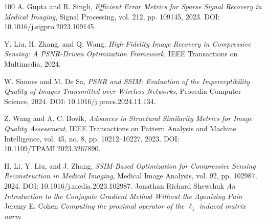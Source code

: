 \documentclass[12pt, a4paper, oneside]{extbook}
\numberwithin{equation}{chapter}
\theoremstyle{definition}
\begin{document}
\begin{thebibliography}{100}
       A. Gupta and R. Singh, \emph{Efficient Error Metrics for Sparse Signal Recovery in Medical Imaging}, Signal Processing, vol. 212, pp. 109145, 2023. DOI: 10.1016/j.sigpro.2023.109145.

       Y. Liu, H. Zhang, and Q. Wang, \emph{High-Fidelity Image Recovery in Compressive Sensing: A PSNR-Driven Optimization Framework}, IEEE Transactions on Multimedia, 2024.

       W. Simoes and M. De Sa, \emph{PSNR and SSIM: Evaluation of the Imperceptibility Quality of Images Transmitted over Wireless Networks}, Procedia Computer Science, 2024. DOI: 10.1016/j.procs.2024.11.134.


       Z. Wang and A. C. Bovik, \emph{Advances in Structural Similarity Metrics for Image Quality Assessment}, IEEE Transactions on Pattern Analysis and Machine Intelligence, vol. 45, no. 8, pp. 10212--10227, 2023. DOI: 10.1109/TPAMI.2023.3267890.

       H. Li, Y. Liu, and J. Zhang, \emph{SSIM-Based Optimization for Compressive Sensing Reconstruction in Medical Imaging}, Medical Image Analysis, vol. 92, pp. 102987, 2024. DOI: 10.1016/j.media.2023.102987.
       Jonathan Richard Shewchuk \emph{An Introduction to the Conjugate Gradient Method Without the Agonizing Pain}
       Jeremy E. Cohen \emph{Computing the proximal operator of the $\ell_1$ induced matrix norm}
    \end{thebibliography}

    \newpage
    
\end{document}
